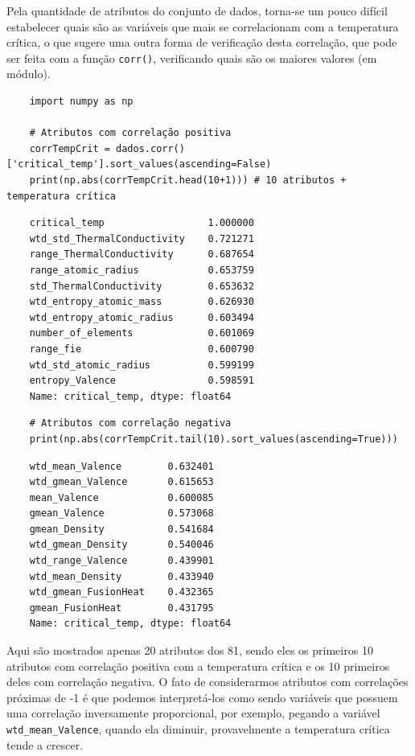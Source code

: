 Pela quantidade de atributos do conjunto de dados, torna-se um pouco difícil estabelecer quais são as variáveis que mais se correlacionam com a temperatura crítica, o que sugere uma outra forma de verificação desta correlação, que pode ser feita com a função \verb|corr()|, verificando quais são os maiores valores (em módulo).
\begin{longlisting}
    \begin{verbatim}
    import numpy as np

    # Atributos com correlação positiva
    corrTempCrit = dados.corr()['critical_temp'].sort_values(ascending=False)
    print(np.abs(corrTempCrit.head(10+1))) # 10 atributos + temperatura crítica
    \end{verbatim}
\end{longlisting}
\begin{verbatim}
    critical_temp                  1.000000
    wtd_std_ThermalConductivity    0.721271
    range_ThermalConductivity      0.687654
    range_atomic_radius            0.653759
    std_ThermalConductivity        0.653632
    wtd_entropy_atomic_mass        0.626930
    wtd_entropy_atomic_radius      0.603494
    number_of_elements             0.601069
    range_fie                      0.600790
    wtd_std_atomic_radius          0.599199
    entropy_Valence                0.598591
    Name: critical_temp, dtype: float64
\end{verbatim}
\begin{longlisting}
    \begin{verbatim}
    # Atributos com correlação negativa
    print(np.abs(corrTempCrit.tail(10).sort_values(ascending=True)))
    \end{verbatim}
\end{longlisting}
\begin{verbatim}
    wtd_mean_Valence        0.632401
    wtd_gmean_Valence       0.615653
    mean_Valence            0.600085
    gmean_Valence           0.573068
    gmean_Density           0.541684
    wtd_gmean_Density       0.540046
    wtd_range_Valence       0.439901
    wtd_mean_Density        0.433940
    wtd_gmean_FusionHeat    0.432365
    gmean_FusionHeat        0.431795
    Name: critical_temp, dtype: float64
\end{verbatim}

Aqui são mostrados apenas 20 atributos dos 81, sendo eles os primeiros 10 atributos com correlação positiva com a temperatura crítica e os 10 primeiros deles com correlação negativa. O fato de considerarmos atributos com correlações próximas de -1 é que podemos interpretá-los como sendo variáveis que possuem uma correlação inversamente proporcional, por exemplo, pegando a variável \verb|wtd_mean_Valence|, quando ela diminuir, provavelmente a temperatura crítica tende a crescer.

